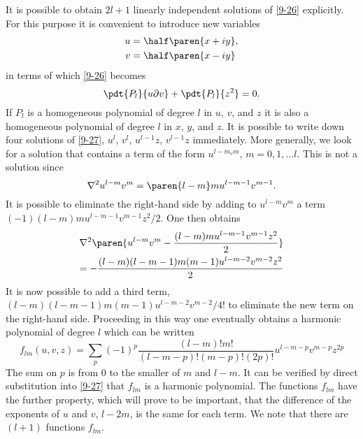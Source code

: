 It is possible to obtain $2l + 1$ linearly independent solutions of \eqref{9-26} explicitly. For this purpose it is convenient to introduce new variables 
\begin{equation*}
  \begin{split}
    u &= \half \paren{x + i y}, \\
    v &= \half \paren{x - i y} 
  \end{split}
\end{equation*}
in terms of which \eqref{9-26} becomes
\begin{equation}
  \pdt{P_{l}} {u \partial v} + \pdt{P_{l}} {z^{2}} = 0.
\label{9-27}
\end{equation}
If $P_{l}$ is a homogeneous polynomial of degree $l$ in $u$, $v$, and $z$ it is also a homogeneous polynomial of degree $l$ in $x$, $y$, and $z$. It is possible to write down four solutions of \eqref{9-27}, $u^{l}$, $v^{l}$, $u^{l-1}z$, $v^{l-1}z$ immediately. More generally, we look for a solution that contains a term of the form $u^{l-m_{v}m}$, $m = 0, 1, \dots l$. This is not a solution
since
\begin{equation}
  \nabla^{2} u^{l-m}v^{m} = \paren{l-m}m u^{l-m-1}v^{m-1} .
\end{equation}
It is possible to eliminate the right-hand side by adding to $u^{l-m}v^{m}$ a term $(-1)(l-m)mu^{l-m-1}v^{m-1}z^{2}/2$. One then obtains
  \begin{multline*}
    \nabla^{2}\paren{u^{l-m}v^{m} - \frac{(l-m)m u^{l-m-1}v^{m-1}z^{2}} {2}} \\
    = - \frac{(l-m)(l-m-1)m(m-1)u^{l-m-2}v^{m-2}z^{2}} {2}
  \end{multline*}
It is now possible to add a third term, $(l-m)(l - m - 1)m(m - 1) u^{l-m-2}v^{m-2}/4!$ to eliminate the new term on the right-hand side. Proceeding in this way one eventually obtains a harmonic polynomial of degree $l$ which can be written
  \begin{equation}
    f_{lm}(u,v,z) = \sum_{p}(-1)^{p} \frac{(l-m)!m!} {(l-m-p)!(m-p)!(2p)!} u^{l-m-p} v^{m-p} z^{2p}
  \label{9-28}
  \end{equation}
The sum on $p$ is from 0 to the smaller of $m$ and $l-m$. It can be verified by direct substitution into \eqref{9-27} that $f_{lm}$ is a harmonic polynomial. The functions $f_{lm}$ have the further property, which will prove to be important, that the difference of the exponents of $u$ and $v$,
$l-2m$, is the same for each term. We note that there are $(l + 1)$ functions $f_{lm}$.

